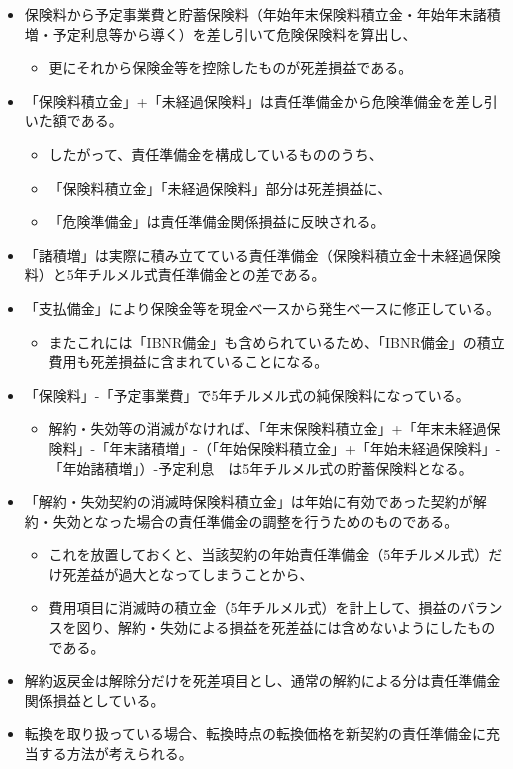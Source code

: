 \documentclass[report,gutter=10mm,fore-edge=10mm,uplatex,dvipdfmx]{jlreq}
\begin{document}
\begin{itemize}
\tightlist
\item
  保険料から予定事業費と貯蓄保険料（年始年末保険料積立金・年始年末諸積増・予定利息等から導く）を差し引いて危険保険料を算出し、

  \begin{itemize}
  \tightlist
  \item
    更にそれから保険金等を控除したものが死差損益である。
  \end{itemize}
\item
  「保険料積立金」+「未経過保険料」は責任準備金から危険準備金を差し引いた額である。

  \begin{itemize}
  \tightlist
  \item
    したがって、責任準備金を構成しているもののうち、
  \item
    「保険料積立金」「未経過保険料」部分は死差損益に、
  \item
    「危険準備金」は責任準備金関係損益に反映される。
  \end{itemize}
\item
  「諸積増」は実際に積み立てている責任準備金（保険料積立金十未経過保険料）と5年チルメル式責任準備金との差である。
\item
  「支払備金」により保険金等を現金べ一スから発生べ一スに修正している。

  \begin{itemize}
  \tightlist
  \item
    またこれには「IBNR備金」も含められているため、「IBNR備金」の積立費用も死差損益に含まれていることになる。
  \end{itemize}
\item
  「保険料」-「予定事業費」で5年チルメル式の純保険料になっている。

  \begin{itemize}
  \tightlist
  \item
    解約・失効等の消滅がなければ、「年末保険料積立金」+「年末未経過保険料」-「年末諸積増」-（「年始保険料積立金」+「年始未経過保険料」-「年始諸積増」）-予定利息　は5年チルメル式の貯蓄保険料となる。
  \end{itemize}
\item
  「解約・失効契約の消滅時保険料積立金」は年始に有効であった契約が解約・失効となった場合の責任準備金の調整を行うためのものである。

  \begin{itemize}
  \tightlist
  \item
    これを放置しておくと、当該契約の年始責任準備金（5年チルメル式）だけ死差益が過大となってしまうことから、
  \item
    費用項目に消滅時の積立金（5年チルメル式）を計上して、損益のバランスを図り、解約・失効による損益を死差益には含めないようにしたものである。
  \end{itemize}
\item
  解約返戻金は解除分だけを死差項目とし、通常の解約による分は責任準備金関係損益としている。
\item
  転換を取り扱っている場合、転換時点の転換価格を新契約の責任準備金に充当する方法が考えられる。


\end{itemize}
\end{document}

